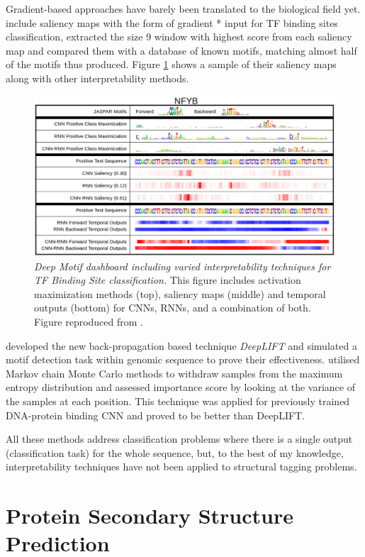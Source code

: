 		Gradient-based approaches have barely been translated to the biological field yet. \cite{Lanchantin2016} include saliency maps with the form of gradient * input for TF binding sites classification, extracted the size 9 window with highest score from each saliency map and compared them with a database of known motifs, matching almost half of the motifs thus produced. Figure \ref{fig:demo} shows a sample of their saliency maps along with other interpretability methods.
		
		\begin{figure}
		\centering
		\includegraphics[width=0.8\linewidth]{Figures/demo}
		\caption{\textit{Deep Motif dashboard including varied interpretability techniques for TF Binding Site classification.} This figure includes activation maximization methods (top), saliency maps (middle) and temporal outputs (bottom) for CNNs, RNNs, and a combination of both. Figure reproduced from \cite{Lanchantin2016}.}
		\label{fig:demo}
		\end{figure}

		\cite{Shrikumar2017} developed the new back-propagation based technique \textit{DeepLIFT} and simulated a motif detection task within genomic sequence to prove their effectiveness. \cite{Finnegan2017} utilised Markov chain Monte Carlo methods to withdraw samples from the maximum entropy distribution and assessed importance score by looking at the variance of the samples at each position. This technique was applied for previously trained DNA-protein binding CNN and proved to be better than DeepLIFT.
		
		All these methods address classification problems where there is a single output (classification task) for the whole sequence, but, to the best of my knowledge, interpretability techniques have not been applied to structural tagging problems.
		
			
\section{Protein Secondary Structure Prediction}

